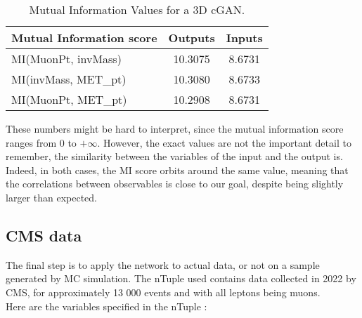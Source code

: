 \begin{table}[H]
    \centering
    \begin{tabular}{|l|c|c|}
        \hline
        \textbf{Mutual Information score} & \textbf{Outputs} & \textbf{Inputs} \\
        \hline
        MI(MuonPt, invMass) & 10.3075 & 8.6731 \\
        MI(invMass, MET\_pt) & 10.3080 & 8.6733 \\
        MI(MuonPt, MET\_pt) & 10.2908 & 8.6731 \\
        \hline
    \end{tabular}
    \caption{Mutual Information Values for a 3D cGAN.}
    \label{tab:mi_values}
\end{table}
These numbers might be hard to interpret, since the mutual information score ranges from 0 to $+\infty$. However, the exact values are not the important detail to remember, the similarity between the variables of the input and the output is. Indeed, in both cases, the MI score orbits around the same value, meaning that the correlations between observables is close to our goal, despite being slightly larger than expected.

\subsection{CMS data}

The final step is to apply the network to actual data, or not on a sample generated by MC simulation. The nTuple used contains data collected in 2022 by CMS, for approximately 13 000 events and with all leptons being muons.\\
Here are the variables specified in the nTuple :

